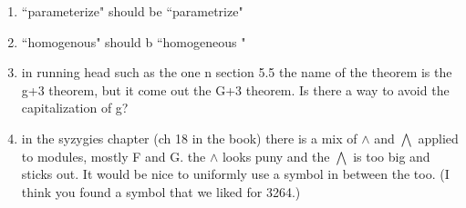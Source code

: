 \documentclass[12pt, leqno]{book}
\begin{document}
\begin{enumerate}
 \item  ``parameterize" should be  ``parametrize"
 
\item ``homogenous" should b ``homogeneous " 

\item in running head such as the one n section 5.5 the name of the theorem is the g+3 theorem, but it come out the G+3 theorem.
Is there a way to avoid the capitalization of g?

\item in the syzygies chapter (ch 18 in the book) there is a mix of $\wedge$ and $\bigwedge$ applied to modules, mostly F and G.
the $\wedge$ looks puny and the $\bigwedge$ is too big and sticks out. It would be nice to uniformly use a symbol in between the too.
(I think you found a symbol that we liked for 3264.)
 
 \end{enumerate}
\end{document}
